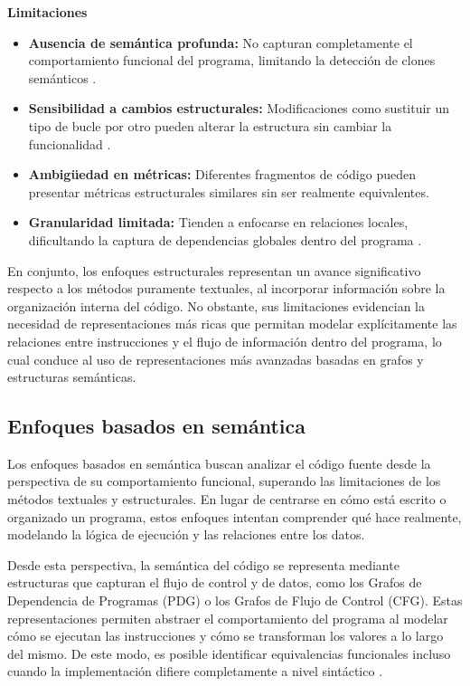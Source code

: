 \textbf{Limitaciones}
\begin{itemize}
    \item \textbf{Ausencia de semántica profunda:} No capturan completamente el comportamiento funcional del programa, limitando la detección de clones semánticos \cite{karakatic2022software}.
    
    \item \textbf{Sensibilidad a cambios estructurales:} Modificaciones como sustituir un tipo de bucle por otro pueden alterar la estructura sin cambiar la funcionalidad \cite{Roy2007Survey}.
    
    \item \textbf{Ambigüedad en métricas:} Diferentes fragmentos de código pueden presentar métricas estructurales similares sin ser realmente equivalentes.
    
    \item \textbf{Granularidad limitada:} Tienden a enfocarse en relaciones locales, dificultando la captura de dependencias globales dentro del programa \cite{karakatic2022software}.
\end{itemize}

En conjunto, los enfoques estructurales representan un avance significativo respecto a los métodos puramente textuales, al incorporar información sobre la organización interna del código. No obstante, sus limitaciones evidencian la necesidad de representaciones más ricas que permitan modelar explícitamente las relaciones entre instrucciones y el flujo de información dentro del programa, lo cual conduce al uso de representaciones más avanzadas basadas en grafos y estructuras semánticas.

\subsection{Enfoques basados en semántica}

Los enfoques basados en semántica buscan analizar el código fuente desde la perspectiva de su comportamiento funcional, superando las limitaciones de los métodos textuales y estructurales. En lugar de centrarse en cómo está escrito o organizado un programa, estos enfoques intentan comprender qué hace realmente, modelando la lógica de ejecución y las relaciones entre los datos.

Desde esta perspectiva, la semántica del código se representa mediante estructuras que capturan el flujo de control y de datos, como los Grafos de Dependencia de Programas (PDG) o los Grafos de Flujo de Control (CFG). Estas representaciones permiten abstraer el comportamiento del programa al modelar cómo se ejecutan las instrucciones y cómo se transforman los valores a lo largo del mismo. De este modo, es posible identificar equivalencias funcionales incluso cuando la implementación difiere completamente a nivel sintáctico \cite{Roy2007Survey, Yu2023Graph}.

